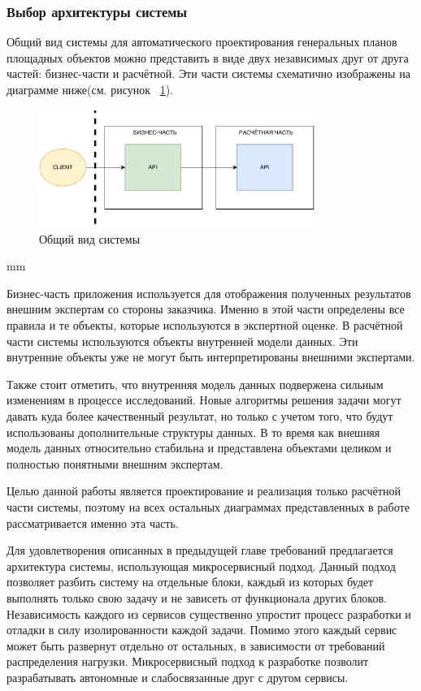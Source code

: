 \subsubsection{{Выбор архитектуры системы}}

Общий вид системы для автоматического проектирования генеральных планов площадных объектов можно представить в виде
двух независимых друг от друга частей: бизнес-части и расчётной.
Эти части системы схематично изображены на диаграмме ниже(см. рисунок \ \ref{pic:architecture__system-diagram}).

\begin{figure}[H]
	\hspace*{-2.5 cm}\includegraphics[width=0.8\textwidth, left]{architecture/pictures/common/system}
	\caption{Общий вид системы}
	\label{pic:architecture__system-diagram}
\end{figure}
 mm

Бизнес-часть приложения используется для отображения полученных результатов внешним экспертам со стороны заказчика.
Именно в этой части определены все правила и те объекты, которые используются в экспертной оценке.
В расчётной части системы используются объекты внутренней модели данных.
Эти внутренние объекты уже не могут быть интерпретированы внешними экспертами.

Также стоит отметить, что внутренняя модель данных подвержена сильным изменениям в процессе исследований.
Новые алгоритмы решения задачи могут давать куда более качественный результат, но только с учетом того, что
будут использованы дополнительные структуры данных. В то время как внешняя модель данных относительно стабильна
и представлена объектами целиком и полностью понятными внешним экспертам.

Целью данной работы является проектирование и реализация только расчётной части системы, поэтому на всех остальных
диаграммах представленных в работе рассматривается именно эта часть.

Для удовлетворения описанных в предыдущей главе требований предлагается архитектура системы,
использующая микросервисный подход. Данный подход позволяет разбить систему на отдельные блоки,
каждый из которых будет выполнять только свою задачу и не зависеть от функционала других блоков.
Независимость каждого из сервисов существенно упростит процесс разработки и отладки в силу изолированности
каждой задачи. Помимо этого каждый сервис может быть развернут отдельно от остальных, в зависимости
от требований распределения нагрузки. Микросервисный подход к разработке позволит разрабатывать
автономные и слабосвязанные друг с другом сервисы.

